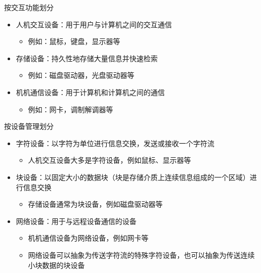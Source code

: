\documentclass[cs4size,a4paper,10pt]{ctexart}
\begin{document}
	按交互功能划分
	\begin{itemize}
		\item 人机交互设备：用于用户与计算机之间的交互通信
		\begin{itemize}
			\item 例如：鼠标，键盘，显示器等
		\end{itemize}
		\item 存储设备：持久性地存储大量信息并快速检索
		\begin{itemize}
			\item 例如：磁盘驱动器，光盘驱动器等
		\end{itemize}
		\item 机机通信设备：用于计算机和计算机之间的通信
		\begin{itemize}
			\item 例如：网卡，调制解调器等
		\end{itemize}
	\end{itemize}

	按设备管理划分
	\begin{itemize}
		\item 字符设备：以字符为单位进行信息交换，发送或接收一个字符流
		\begin{itemize}
			\item 人机交互设备大多是字符设备，例如鼠标、显示器等
		\end{itemize}
		\item 块设备：以固定大小的数据块（块是存储介质上连续信息组成的一个区域）进行信息交换
		\begin{itemize}
			\item 存储设备通常为块设备，例如磁盘驱动器等
		\end{itemize}
		\item 网络设备：用于与远程设备通信的设备
		\begin{itemize}
			\item 机机通信设备为网络设备，例如网卡等
			\item 网络设备可以抽象为传送字符流的特殊字符设备，也可以抽象为传送连续小块数据的块设备
		\end{itemize}
	\end{itemize}
\end{document}
